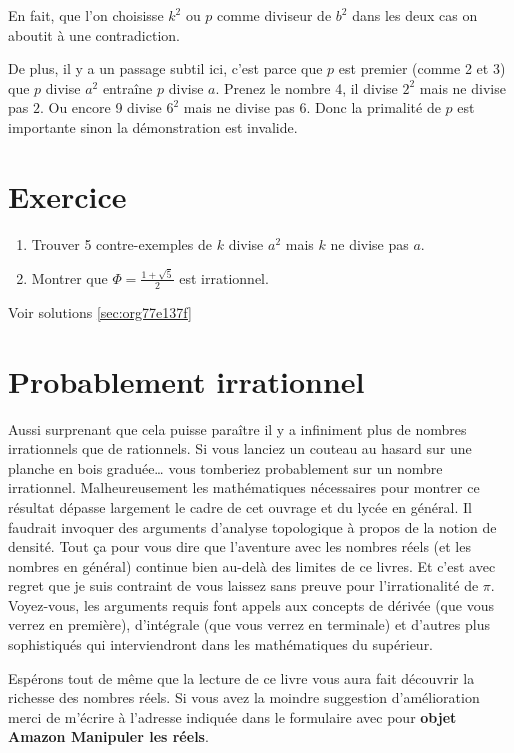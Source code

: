 \documentclass[a4paper, 11pt, twoside]{book}
\begin{document}
En fait, que l'on choisisse \(k^2\) ou \(p\) comme diviseur de \(b^2\)
dans les deux cas on aboutit à une contradiction.

De plus, il y a un passage subtil ici, c'est parce que \(p\) est
premier (comme 2 et 3) que \(p\) divise \(a^2\) entraîne \(p\) divise
\(a\). Prenez le nombre 4, il divise \(2^2\) mais ne divise pas
\(2\). Ou encore 9 divise \(6^2\) mais ne divise pas 6. Donc la
primalité de \(p\) est importante sinon la démonstration est
invalide.

\section{Exercice}
\label{sec:org73038fa}
\begin{enumerate}
\item Trouver 5 contre-exemples de \(k\) divise \(a^2\) mais \(k\) ne
divise pas \(a\).
\item Montrer que \(\Phi = \frac{1 + \sqrt{5}}{2}\) est irrationnel.
\end{enumerate}


Voir solutions \ref{sec:org77e137f}

\section{Probablement irrationnel}
\label{sec:org8f6f14a}

Aussi surprenant que cela puisse paraître il y a infiniment plus
de nombres irrationnels que de rationnels. Si vous lanciez un
couteau au hasard sur une planche en bois graduée\ldots{} vous
tomberiez probablement sur un nombre irrationnel. Malheureusement
les mathématiques nécessaires pour montrer ce résultat dépasse
largement le cadre de cet ouvrage et du lycée en général. Il
faudrait invoquer des arguments d'analyse topologique à propos de
la notion de densité. Tout ça pour vous dire que l'aventure avec
les nombres réels (et les nombres en général) continue bien
au-delà des limites de ce livres. Et c'est avec regret que je suis
contraint de vous laissez sans preuve pour l'irrationalité de
\(\pi\). Voyez-vous, les arguments requis font appels aux concepts
de dérivée (que vous verrez en première), d'intégrale (que vous
verrez en terminale) et d'autres plus sophistiqués qui
interviendront dans les mathématiques du supérieur.

Espérons tout de même que la lecture de ce livre vous aura fait
découvrir la richesse des nombres réels. Si vous avez la moindre
suggestion d'amélioration merci de m'écrire à l'adresse
indiquée dans le formulaire avec pour \textbf{objet Amazon Manipuler les réels}.
\stopcontents[level-2]
\stopcontents[level-1]
\end{document}
